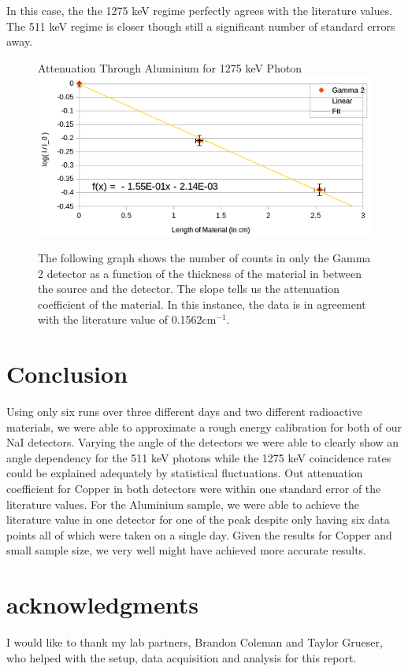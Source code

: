 \documentclass[10pt]{IEEEtran}
\begin{document}
In this case, the the 1275 keV regime perfectly agrees with the literature values. The 511 keV regime is closer though still a significant number of standard errors away.
    \begin{figure}[!hbt]
        \begin{center}
			\normalsize{Attenuation Through Aluminium for 1275 keV Photon}
			\includegraphics[width=\linewidth]{Attenuation1275Al_2}
			\caption{The following graph shows the number of counts in only the Gamma 2 detector as a function of the thickness of the material in between the source and the detector. The slope tells us the attenuation coefficient of the material. In this instance, the data is in agreement with the literature value of 0.1562cm$^{-1}$\cite{nist}.}
			\label{fig:1275al2}
         \end{center}
    \end{figure} 
\section{Conclusion}
    Using only six runs over three different days and two different radioactive materials, we were able to approximate a rough energy calibration for both of our NaI detectors. Varying the angle of the detectors we were able to clearly show an angle dependency for the 511 keV photons while the 1275 keV coincidence rates could be explained adequately by statistical fluctuations. Out attenuation coefficient for Copper in both detectors were within one standard error of the literature values. For the Aluminium sample, we were able to achieve the literature value in one detector for one of the peak despite only having six data points all of which were taken on a single day. Given the results for Copper and small sample size, we very well might have achieved more accurate results.
\section{acknowledgments}
I would like to thank my lab partners, Brandon Coleman and Taylor Grueser, who helped with the setup, data acquisition and analysis for this report.
\printbibliography
\end{document}

